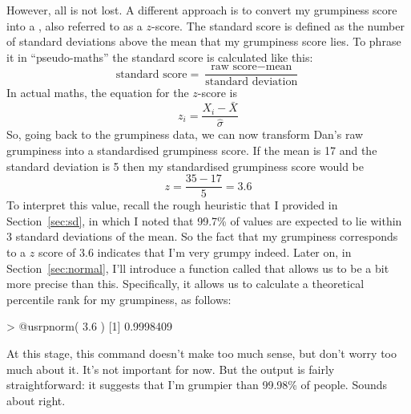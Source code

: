 However, all is not lost. A different approach is to convert my grumpiness score into a , also referred to as a $z$-score. The standard score is defined as the number of standard deviations above the mean that my grumpiness score lies. To phrase it in ``pseudo-maths'' the standard score is calculated like this:
$$
\mbox{standard score} = \frac{\mbox{raw score} - \mbox{mean}}{\mbox{standard deviation}}
$$ 
In actual maths, the equation for the $z$-score is
$$
z_i = \frac{X_i - \bar{X}}{\hat\sigma}
$$
So, going back to the grumpiness data, we can now transform Dan's raw grumpiness into a standardised grumpiness score. If the mean is 17 and the standard deviation is 5 then my standardised grumpiness score would be 
$$
z = \frac{35 - 17}{5} = 3.6
$$
To interpret this value, recall the rough heuristic that I provided in Section~\ref{sec:sd}, in which I noted that 99.7\% of values are expected to lie within 3 standard deviations of the mean. So the fact that my grumpiness corresponds to a $z$ score of 3.6 indicates that I'm very grumpy indeed. Later on, in Section~\ref{sec:normal}, I'll introduce a function called  that allows us to be a bit more precise than this. Specifically, it allows us to calculate a theoretical percentile rank for my grumpiness, as follows: 
\begin{rblock1}
> @usr{pnorm( 3.6 )}
[1] 0.9998409
\end{rblock1}
At this stage, this command doesn't make too much sense, but don't worry too much about it. It's not important for now. But the output is fairly straightforward: it suggests that I'm grumpier than 99.98\% of people. Sounds about right. 


